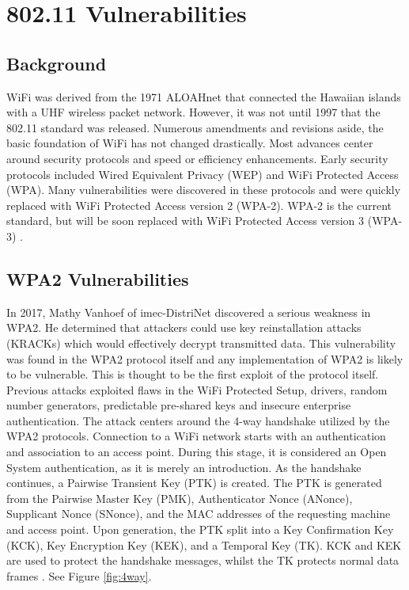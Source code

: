 \documentclass[acmlarge]{acmart}
\begin{document}
\section{802.11 Vulnerabilities}


\subsection{Background}

WiFi was derived from the 1971 ALOAHnet that connected the Hawaiian islands with a UHF wireless packet network. However, it was not until 1997 that the 802.11 standard was released. Numerous amendments and revisions aside, the basic foundation of WiFi has not changed drastically. Most advances center around security protocols and speed or efficiency enhancements. Early security protocols included Wired Equivalent Privacy (WEP) and WiFi Protected Access (WPA). Many vulnerabilities were discovered in these protocols and were quickly replaced with WiFi Protected Access version 2 (WPA-2). WPA-2 is the current standard, but will be soon replaced with WiFi Protected Access version 3 (WPA-3) \cite{berg2011ieee}.


\subsection{WPA2 Vulnerabilities}


In 2017, Mathy Vanhoef of imec-DistriNet discovered a serious weakness in WPA2. He determined that attackers could use key reinstallation attacks (KRACKs) which would effectively decrypt transmitted data. This vulnerability was found in the WPA2 protocol itself and any implementation of WPA2 is likely to be vulnerable. This is thought to be the first exploit of the protocol itself. Previous attacks exploited flaws in the WiFi Protected Setup, drivers, random number generators, predictable pre-shared keys and insecure enterprise authentication. 
The attack centers around the 4-way handshake utilized by the WPA2 protocols. Connection to a WiFi network starts with an authentication and association to an access point. During this stage, it is considered an Open System authentication, as it is merely an introduction.  As the handshake continues, a Pairwise Transient Key (PTK) is created. The PTK is generated from the Pairwise Master Key (PMK), Authenticator Nonce (ANonce), Supplicant Nonce (SNonce), and the MAC addresses of the requesting machine and access point. Upon generation, the PTK split into a Key Confirmation Key (KCK), Key Encryption Key (KEK), and a Temporal Key (TK). KCK and KEK are used to protect the handshake messages, whilst the TK protects normal data frames \cite{vanhoef2017key}. See Figure \ref{fig:4way}.
\end{document}
